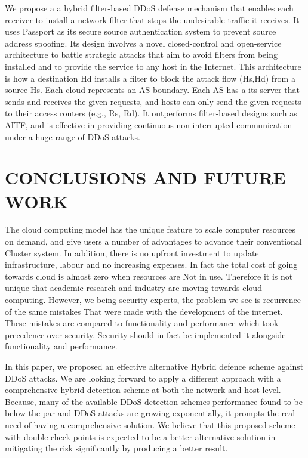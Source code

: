 \documentclass[letterpaper, 10 pt, conference]{ieeeconf}  %
\begin{document}
We propose a a hybrid filter-based DDoS defense
mechanism that enables each receiver to install a network filter that stops the undesirable traffic it receives. It uses Passport as its secure source authentication system to prevent source address spoofing. Its design involves a novel closed-control and open-service architecture to battle strategic
attacks that aim to avoid filters from being installed and to provide the service to any host in the Internet. This architecture is how a destination Hd installs a filter to block the attack flow (Hs,Hd) from a source Hs. Each cloud represents an AS boundary. Each AS has a its server that sends and receives the given requests, and hosts can only send the given requests to their access routers (e.g., Rs, Rd). It outperforms filter-based designs such as AITF, and is effective in providing continuous non-interrupted communication under a huge range of DDoS attacks.



\section{CONCLUSIONS AND FUTURE WORK}

The cloud computing model has the unique feature  to scale computer resources on demand, and give users a number of advantages to advance their conventional Cluster system. In addition, there is no upfront investment to update infrastructure, labour and no increasing expenses. In fact the total cost of going towards cloud is almost zero when resources are Not in use. Therefore it is not unique that academic research and industry are moving towards cloud computing. However, we being security experts, the problem we see is recurrence of the same mistakes That were made with the development of the internet. These mistakes are compared to functionality and performance which took precedence over security. Security should in fact be implemented it alongside functionality and performance.

In this paper, we proposed an effective alternative
Hybrid defence scheme against DDoS attacks. We are looking forward to apply a different approach with a comprehensive hybrid detection scheme at both the network and host level. Because, many of the available DDoS detection schemes performance found to be below the par and DDoS attacks are growing exponentially, it prompts the real need of having a comprehensive solution. We believe that this proposed scheme with double check points is expected to be a better alternative solution in mitigating the risk significantly by producing a better result.
\end{document}
